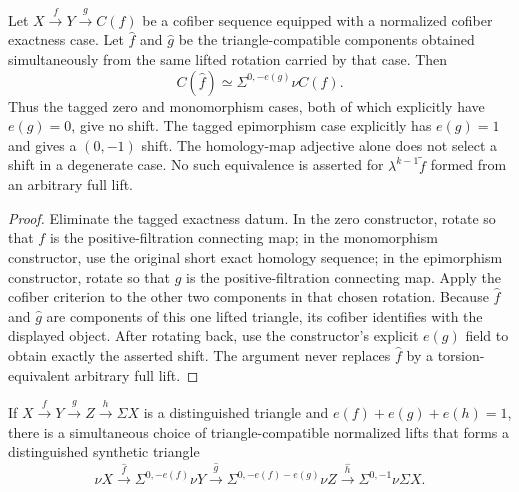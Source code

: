 \begin{proposition}
  \label{prop:synthetic-hat-cofiber}
  \notready
  Let $X\xrightarrow fY\xrightarrow gC(f)$ be a cofiber sequence equipped with
  a normalized cofiber exactness case.  Let $\widehat f$ and $\widehat g$ be
  the triangle-compatible components obtained simultaneously from the same
  lifted rotation carried by that case.  Then
  \[
    C(\widehat f)\simeq\Sigma^{0,-e(g)}\nu C(f).
  \]
  Thus the tagged zero and monomorphism cases, both of which explicitly have
  $e(g)=0$, give no shift.  The tagged epimorphism case explicitly has
  $e(g)=1$ and gives a $(0,-1)$ shift.  The homology-map adjective alone does
  not select a shift in a degenerate case.  No such equivalence is asserted for
  $\lambda^{k-1}\widetilde f$ formed from an arbitrary full lift.
\end{proposition}

\begin{proof}
  Eliminate the tagged exactness datum.  In the zero constructor, rotate so
  that $f$ is the positive-filtration connecting map; in the monomorphism
  constructor, use the original short exact homology sequence; in the
  epimorphism constructor, rotate so that $g$ is the positive-filtration
  connecting map.
  Apply the cofiber criterion to the other two components in that chosen
  rotation.  Because $\widehat f$ and $\widehat g$ are components of this one
  lifted triangle, its cofiber identifies with the displayed object.  After
  rotating back, use the constructor's explicit $e(g)$ field to obtain exactly
  the asserted shift.  The argument never
  replaces $\widehat f$ by a torsion-equivalent arbitrary full lift.
\end{proof}

\begin{proposition}
  \label{prop:normalized-synthetic-triangle}
  \notready
  If $X\xrightarrow fY\xrightarrow gZ\xrightarrow h\Sigma X$ is a
  distinguished triangle and $e(f)+e(g)+e(h)=1$, there is a simultaneous
  choice of triangle-compatible normalized lifts that forms a distinguished
  synthetic triangle
  \[
    \nu X\xrightarrow{\widehat f}\Sigma^{0,-e(f)}\nu Y
    \xrightarrow{\widehat g}\Sigma^{0,-e(f)-e(g)}\nu Z
    \xrightarrow{\widehat h}\Sigma^{0,-1}\nu\Sigma X.
  \]
\end{proposition}

